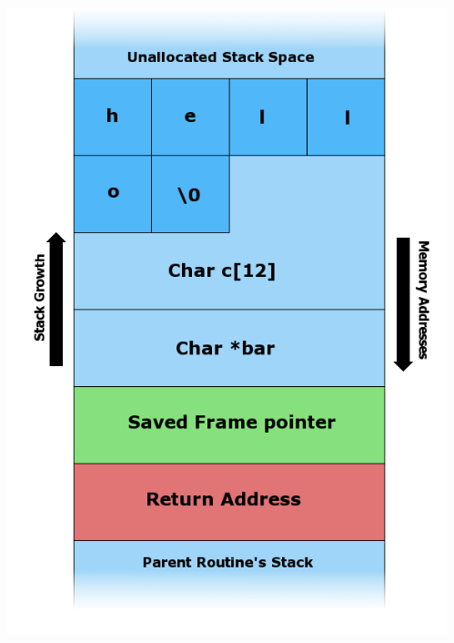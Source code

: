 \documentclass{beamer}
\begin{document}
\begin{frame}
\begin{columns}[t]
     \begin{column}[T]{4cm} %
         \includegraphics[scale=0.2]{Stack_Overflow_3.png}
     \end{column}
     \begin{column}[T]{6cm} %

\end{column}
\end{columns}
\end{frame}
\end{document}
